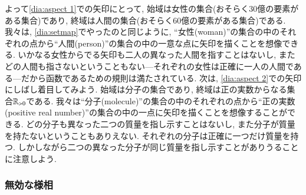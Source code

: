 
よって\eqref{dia:aspect 1}での矢印にとって, 始域は女性の集合(おそらく30億の要素がある集合)であり, 終域は人間の集合(おそらく60億の要素がある集合)である. 我々は, \eqref{dia:setmap}でやったのと同じように, ``女性(woman)''の集合の中のそれぞれの点から``人間(person)''の集合の中の一意な点に矢印を描くことを想像できる. いかなる女性からでる矢印も二人の異なった人間を指すことはないし, またどの人間も指さないということもない---それぞれの女性は正確に一人の人間である---だから函数であるための規則は満たされている. 次は, \eqref{dia:aspect 2}での矢印にしばし着目してみよう. 始域は分子の集合であり, 終域は正の実数からなる集合${\mathbb R}_{>0}$である. 我々は``分子(molecule)''の集合の中のそれぞれの点から``正の実数(positive real number)''の集合の中の一点に矢印を描くことを想像することができる. どの分子も異なった二つの質量を指し示すことはないし, また分子が質量を持たないということもありえない. それぞれの分子は正確に一つだけ質量を持つ. しかしながら二つの異なった分子が同じ質量を指し示すことがありうることに注意しよう.


\subsubsection{無効な様相}\label{sec:invalid aspect}

